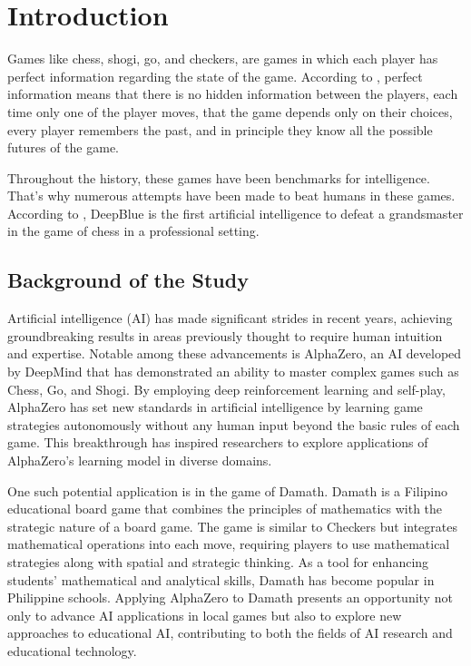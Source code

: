 \chapter{Introduction}

Games like chess, shogi, go, and checkers, are games in which each player has perfect information regarding the state of the game. According to \cite{MYCIELSKI199241}, perfect information means that there is no hidden information between the players, each time only one of the player moves, that the game depends only on their choices, every player remembers the past, and in principle they know all the possible futures of the game.

Throughout the history, these games have been benchmarks for intelligence. That's why numerous attempts have been made to beat humans in these games. According to \cite{hsu2002behind}, DeepBlue is the first artificial intelligence to defeat a grandsmaster in the game of chess in a professional setting.

\section{Background of the Study}

Artificial intelligence (AI) has made significant strides in recent years, achieving groundbreaking results in areas previously thought to require human intuition and expertise. Notable among these advancements is AlphaZero, an AI developed by DeepMind that has demonstrated an ability to master complex games such as Chess, Go, and Shogi. By employing deep reinforcement learning and self-play, AlphaZero has set new standards in artificial intelligence by learning game strategies autonomously without any human input beyond the basic rules of each game. This breakthrough has inspired researchers to explore applications of AlphaZero’s learning model in diverse domains.

One such potential application is in the game of Damath. Damath is a Filipino educational board game that combines the principles of mathematics with the strategic nature of a board game. The game is similar to Checkers but integrates mathematical operations into each move, requiring players to use mathematical strategies along with spatial and strategic thinking. As a tool for enhancing students' mathematical and analytical skills, Damath has become popular in Philippine schools. Applying AlphaZero to Damath presents an opportunity not only to advance AI applications in local games but also to explore new approaches to educational AI, contributing to both the fields of AI research and educational technology.

